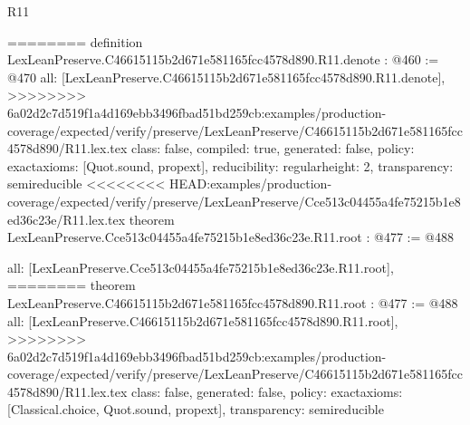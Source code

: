 \begin{lexlean}{R11}
\begin{coremodule}
{{{{========
definition LexLeanPreserve.C46615115b2d671e581165fcc4578d890.R11.denote : @460 := @470 {
  all: [LexLeanPreserve.C46615115b2d671e581165fcc4578d890.R11.denote],
>>>>>>>> 6a02d2c7d519f1a4d169ebb3496fbad51bd259cb:examples/production-coverage/expected/verify/preserve/LexLeanPreserve/C46615115b2d671e581165fcc4578d890/R11.lex.tex
  class: false,
  compiled: true,
  generated: false,
  policy: exact{axioms: [Quot.sound, propext]},
  reducibility: regular{height: 2},
  transparency: semireducible
}
<<<<<<<< HEAD:examples/production-coverage/expected/verify/preserve/LexLeanPreserve/Cce513c04455a4fe75215b1e8ed36c23e/R11.lex.tex
theorem LexLeanPreserve.Cce513c04455a4fe75215b1e8ed36c23e.R11.root : @477 := @488 {
  all: [LexLeanPreserve.Cce513c04455a4fe75215b1e8ed36c23e.R11.root],
========
theorem LexLeanPreserve.C46615115b2d671e581165fcc4578d890.R11.root : @477 := @488 {
  all: [LexLeanPreserve.C46615115b2d671e581165fcc4578d890.R11.root],
>>>>>>>> 6a02d2c7d519f1a4d169ebb3496fbad51bd259cb:examples/production-coverage/expected/verify/preserve/LexLeanPreserve/C46615115b2d671e581165fcc4578d890/R11.lex.tex
  class: false,
  generated: false,
  policy: exact{axioms: [Classical.choice, Quot.sound, propext]},
  transparency: semireducible
}

}}}}}
\end{coremodule}
\end{lexlean}
